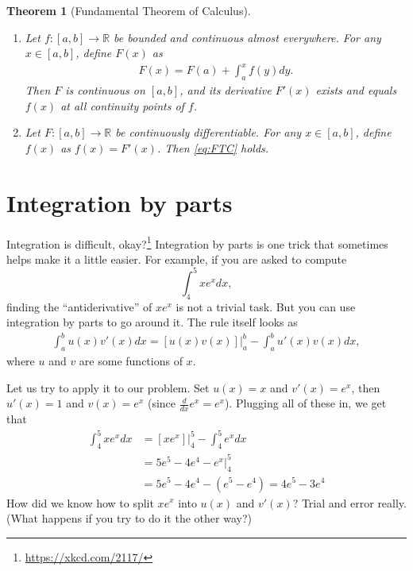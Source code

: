 \documentclass{article}
\newtheorem{theorem}{Theorem}
\begin{document}
\begin{theorem}[Fundamental Theorem of Calculus]
	\,
	\begin{enumerate}
		\item Let $f:[a,b] \to \mathbb{R}$ be bounded and continuous almost everywhere. For any $x \in [a,b]$, define $F(x)$ as
		\begin{align} \label{eq:FTC}
			F(x) = F(a) + \int_a^x f(y) dy.
		\end{align}
		Then $F$ is continuous on $[a,b]$, and its derivative $F'(x)$ exists and equals $f(x)$ at all continuity points of $f$.
		
		\item Let $F:[a,b] \to \mathbb{R}$ be continuously differentiable. For any $x \in [a,b]$, define $f(x)$ as $f(x)=F'(x)$. Then \eqref{eq:FTC} holds.
	\end{enumerate}
\end{theorem}




\section{Integration by parts}

Integration is difficult, okay?\footnote{\url{https://xkcd.com/2117/}} Integration by parts is one trick that sometimes helps make it a little easier. For example, if you are asked to compute 
$$\int_4^5 xe^x dx,$$ finding the ``antiderivative'' of $xe^x$ is not a trivial task. But you can use integration by parts to go around it. The rule itself looks as
\begin{align} \label{eq:IBP}
	\int_a^b u(x) v'(x) dx = [u(x)v(x)]|_a^b - \int_a^b u'(x) v(x) dx,
\end{align}
where $u$ and $v$ are some functions of $x$. 

Let us try to apply it to our problem. Set $u(x)=x$ and $v'(x)=e^x$, then $u'(x)=1$ and $v(x)=e^x$ (since $\frac{d}{dx}e^x = e^x$). Plugging all of these in, we get that
\begin{align*}
	\int_4^5 xe^x dx &= \left.\left[xe^x\right]\right|_4^5 - \int_4^5 e^x dx
	\\
	&=5e^5 - 4e^4 - \left. e^x \right|_4^5
	\\
	&=5e^5 - 4e^4 - \left(e^5 - e^4\right) = 4e^5 - 3e^4
\end{align*}
How did we know how to split $xe^x$ into $u(x)$ and $v'(x)$? Trial and error really. (What happens if you try to do it the other way?)
\end{document}
